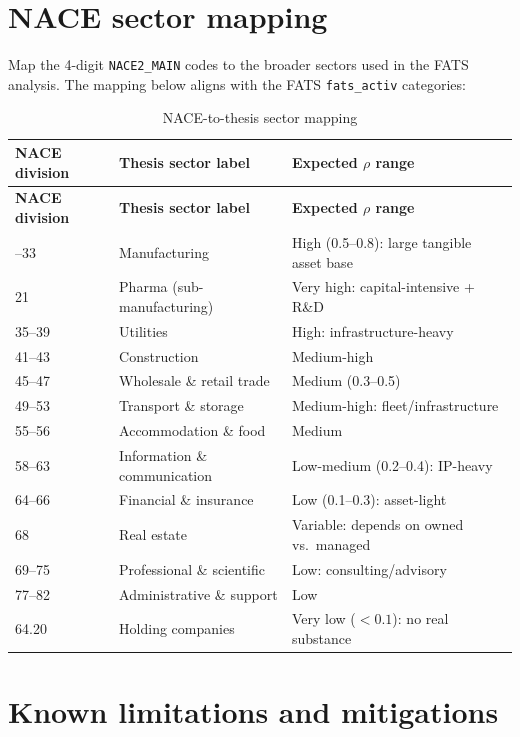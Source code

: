 \documentclass[11pt,a4paper]{article}
\newcommand{\field}[1]{\texttt{#1}}
\begin{document}
\section{NACE sector mapping}\label{sec:nace}

Map the 4-digit \field{NACE2\_MAIN} codes to the broader sectors used in the FATS analysis. The mapping below aligns with the FATS \texttt{fats\_activ} categories:

\begin{longtable}{@{}llL{6cm}@{}}
\caption{NACE-to-thesis sector mapping}\label{tab:nace_map}\\
\toprule
\textbf{NACE division} & \textbf{Thesis sector label} & \textbf{Expected $\rho$ range} \\
\midrule
\endfirsthead
\toprule
\textbf{NACE division} & \textbf{Thesis sector label} & \textbf{Expected $\rho$ range} \\
\midrule
\endhead
\bottomrule
{}--33 & Manufacturing & High (0.5--0.8): large tangible asset base \\
21 & Pharma (sub-manufacturing) & Very high: capital-intensive + R\&D \\
35--39 & Utilities & High: infrastructure-heavy \\
41--43 & Construction & Medium-high \\
45--47 & Wholesale \& retail trade & Medium (0.3--0.5) \\
49--53 & Transport \& storage & Medium-high: fleet/infrastructure \\
55--56 & Accommodation \& food & Medium \\
58--63 & Information \& communication & Low-medium (0.2--0.4): IP-heavy \\
64--66 & Financial \& insurance & Low (0.1--0.3): asset-light \\
68 & Real estate & Variable: depends on owned vs.\ managed \\
69--75 & Professional \& scientific & Low: consulting/advisory \\
77--82 & Administrative \& support & Low \\
64.20 & Holding companies & Very low ($<0.1$): no real substance \\
\end{longtable}


\section{Known limitations and mitigations}\label{sec:limitations}
\end{document}
